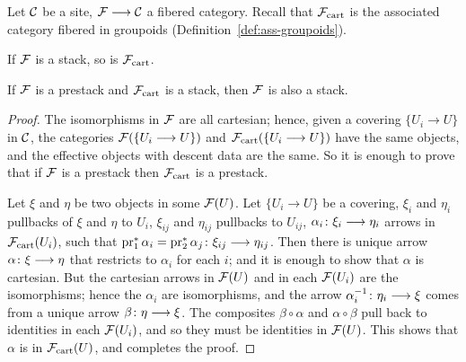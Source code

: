 \begin{4   STACKS}
\begin{4.1 Descent of objects of fibcats}
\begin{proposition}

Let $\mathcal{C}$ be a site, $\cF \arr \cC$ a fibered category. Recall that $\mathcal{F}_\mathrm{cart}$ is the associated category fibered in groupoids (Definition~\ref{def:ass-groupoids}).

\begin{enumeratei}

 If $\mathcal{F}$ is a stack, so is $\mathcal{F}_\mathrm{cart}$.

 If $\mathcal{F}$ is a prestack and $\mathcal{F}_\mathrm{cart}$ is a stack, then $\mathcal{F}$ is also a stack.

\end{enumeratei}
\end{proposition}

\begin{proof}
The isomorphisms in $\mathcal{F}$ are all cartesian; hence, given a covering $\{U_i \to U\}$ in $\mathcal{C}$, the categories $\mathcal{F}(\{U_i \longrightarrow U\})$ and $\mathcal{F}_\mathrm{cart}(\{U_i \longrightarrow U\})$ have the same objects, and the effective objects with descent data are the same. So it is enough to prove that if $\mathcal{F}$ is a prestack then $\mathcal{F}_\mathrm{cart}$ is a prestack.

Let $\xi$ and $\eta$ be two objects in some $\mathcal{F}(U)$. Let $\{U_i \to U\}$ be a covering, $\xi_i$ and $\eta_i$ pullbacks of $\xi$ and $\eta$ to $U_i$, $\xi_{ij}$ and $\eta_{ij}$ pullbacks to $U_{ij}$, $\alpha_i \colon \xi_i \arr \eta_i$ arrows in $\mathcal{F}_\mathrm{cart}(U_i)$, such that $\pr_1^* \alpha_i = \pr_2^* \alpha_j \colon \xi_{ij} \arr \eta_{ij}$. Then there is unique arrow $\alpha \colon \xi \arr \eta$ that restricts to $\alpha_i$ for each $i$; and it is enough to show that $\alpha$ is cartesian. But the cartesian arrows in $\mathcal{F}(U)$ and in each $\mathcal{F}(U_i)$ are the isomorphisms; hence the $\alpha_i$ are isomorphisms, and the arrow $\alpha_i^{-1} \colon \eta_i \arr \xi$ comes from a unique arrow $\beta \colon \eta \arr \xi$. The composites $\beta \circ \alpha$ and $\alpha \circ \beta$ pull back to identities in each $\mathcal{F}(U_i)$, and so they must be identities in $\mathcal{F}(U)$. This shows that $\alpha$ is in $\mathcal{F}_\mathrm{cart}(U)$, and completes the proof.
\end{proof}






\end{4.1 Descent of objects of fibcats}
\end{4   STACKS}
